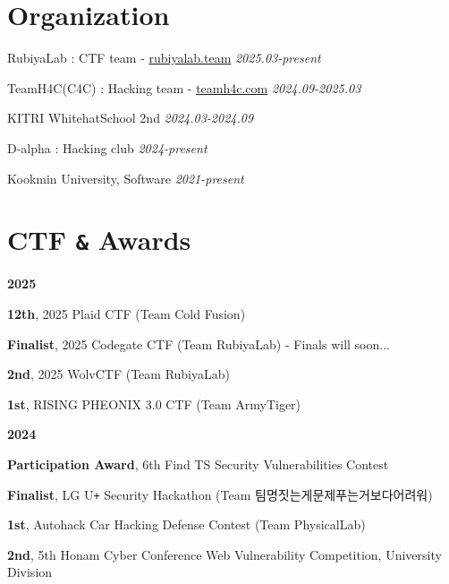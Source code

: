 \documentclass[margin,line]{resume}
\begin{document}
\begin{resume}
 	

 	    \section{\mysidestyle Organization}%
 	      \begin{list2}
 	      \item{RubiyaLab : CTF team - \href{https://rubiyalab.team}{rubiyalab.team} \hfill \textsl{2025.03-present}}
            \item{TeamH4C(C4C) : Hacking team - \href{https://teamh4c.com}{teamh4c.com} \hfill \textsl{2024.09-2025.03}}
 	      \item{KITRI WhitehatSchool 2nd  \hfill \textsl{2024.03-2024.09}}
            \item{D-alpha : Hacking club  \hfill \textsl{2024-present}}
 	      \item{Kookmin University, Software  \hfill \textsl{2021-present}}
 	      
 	      \end{list2}


        \section{\mysidestyle CTF \texttt{\&} Awards}
      
        \textbf{2025}
        \vspace{1mm}
        \begin{list2}
          \item \textbf{12th}, 2025 Plaid CTF (Team Cold Fusion)
          \item \textbf{Finalist}, 2025 Codegate CTF (Team RubiyaLab) - Finals will soon...
          \item \textbf{2nd}, 2025 WolvCTF (Team RubiyaLab)
          \item \textbf{1st}, RISING PHEONIX 3.0 CTF (Team ArmyTiger)
        \end{list2}
        
        \textbf{2024}
        \vspace{1mm}
        \begin{list2}
          \item \textbf{Participation Award}, 6th Find TS Security Vulnerabilities Contest
          \item \textbf{Finalist}, LG U\texttt{+} Security Hackathon (Team 팀명짓는게문제푸는거보다어려워)
          \item \textbf{1st}, Autohack Car Hacking Defense Contest (Team PhysicalLab)
          \item \textbf{2nd}, 5th Honam Cyber Conference Web Vulnerability Competition, University Division
        \end{list2}


\end{resume}
\end{document}
